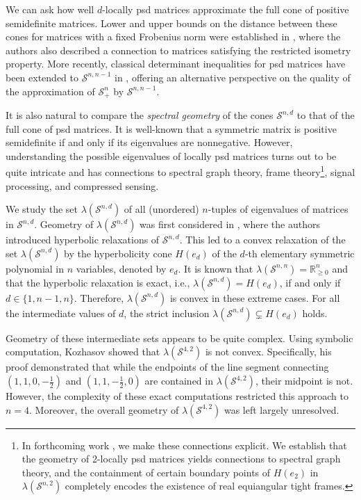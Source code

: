 \documentclass[reqno,hidelinks,11pt]{amsart}
\numberwithin{equation}{section}
\def\S{\mathcal{S}}
\begin{document}
We can ask how well $d$-locally psd matrices approximate the full cone of positive semidefinite matrices.
Lower and upper bounds on the distance between these cones for matrices with a fixed Frobenius norm were established in \cite{blekherman2022sparse}, where the authors also described a connection to matrices satisfying the restricted isometry property. More recently, classical determinant inequalities for psd matrices have been extended to $\S^{n,n-1}$ in \cite{fallat2026determinant}, offering an alternative perspective on the quality of the approximation of $\S^n_+$ by $\S^{n,n-1}$.

It is also natural to compare the \emph{spectral geometry} of the cones $\S^{n,d}$ to that of the full cone of psd matrices. It is well-known that a symmetric matrix is positive semidefinite if and only if its eigenvalues are nonnegative. However, understanding the possible eigenvalues of locally psd matrices turns out to be quite intricate and has connections to spectral graph theory, frame theory\footnote{In forthcoming work \cite{acevedo2026}, we make these connections explicit. We establish that the geometry of 2-locally psd matrices yields connections to spectral graph theory, and the containment of certain boundary points of $H(e_2)$ in $\lambda(\mathcal{S}^{n,2})$ completely encodes the existence of real equiangular tight frames.}, signal processing, and compressed sensing.  

We study the set $\lambda(\mathcal{S}^{n,d})$ of all (unordered) $n$-tuples of eigenvalues of matrices in $\mathcal{S}^{n,d}$. Geometry of $\lambda(\S^{n,d})$ was first considered in \cite{blekherman2022hyperbolic}, where the authors introduced hyperbolic relaxations of $\S^{n,d}$. This led to a convex relaxation of the set $\lambda(\S^{n,d})$ by the hyperbolicity cone $H(e_d)$ of the $d$-th elementary symmetric polynomial in $n$ variables, denoted by $e_d$. 
It is known that $\lambda(\mathcal{S}^{n,n}) = \mathbb{R}^n_{\geq 0}$ and that the hyperbolic relaxation is exact, i.e.,
$\lambda(\mathcal{S}^{n,d}) = H(e_d)$, if and only if $d \in \{1, n - 1, n\}$. Therefore, $\lambda(\mathcal{S}^{n,d})$  is convex in these extreme cases. For all the intermediate values of $d$, the strict inclusion $\lambda(\S^{n,d}) \subsetneq H(e_d)$ holds.

Geometry of these intermediate sets appears to be quite complex.
Using symbolic computation, Kozhasov \cite{kozhasov2023eigenvalues} showed that $\lambda(\mathcal{S}^{4,2})$ is not convex. Specifically, his proof demonstrated that while the endpoints of the line segment connecting $(1,1,0,-\frac{1}{2})$ and $(1,1,-\frac{1}{2},0)$ are contained in $\lambda(\mathcal{S}^{4,2})$, their midpoint is not. However, the complexity of these exact computations restricted this approach to $n = 4$. Moreover, the overall geometry of $\lambda(\S^{4,2})$  was left largely unresolved. 
\end{document}
